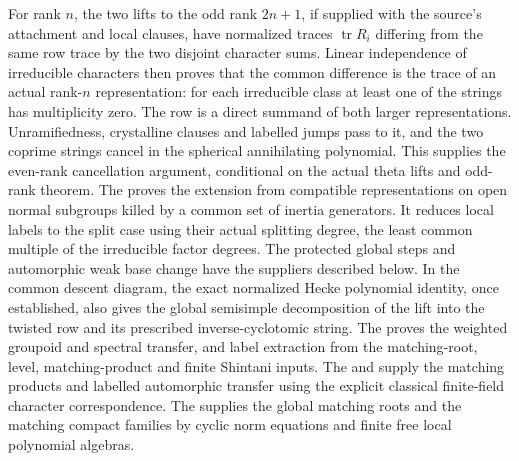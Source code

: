 For rank \(n\), the two lifts to the odd rank \(2n+1\),
if supplied with the source's attachment and local clauses,
have normalized traces \(\operatorname{tr} R_i\) differing
from the same row trace by the two disjoint character sums.
Linear independence of irreducible characters then proves
that the common difference is the trace of an actual
rank-\(n\) representation: for each irreducible class at
least one of the strings has multiplicity zero.
The row is a direct summand of both larger representations.
Unramifiedness, crystalline clauses and labelled jumps
pass to it, and the two coprime strings cancel in the
spherical annihilating polynomial. This supplies the
even-rank cancellation argument, conditional on the actual
theta lifts and odd-rank theorem. The
 proves the extension from compatible representations on
open normal subgroups killed by a common set of inertia generators.
It reduces local labels to the split case using their actual
splitting degree, the least common multiple of the irreducible
factor degrees. The protected global steps and automorphic weak base
change have the suppliers described below. In the
common descent diagram, the exact normalized Hecke
polynomial identity, once established, also gives the
global semisimple decomposition of the lift into the
twisted row and its prescribed inverse-cyclotomic string.
The 
proves the weighted groupoid and spectral transfer, and label extraction
from the matching-root, level, matching-product and finite Shintani inputs.
The 
and 
supply the matching products and labelled automorphic transfer using
the explicit classical finite-field character correspondence.
The 
supplies the global matching roots and the matching compact families
by cyclic norm equations and finite free local polynomial algebras.

